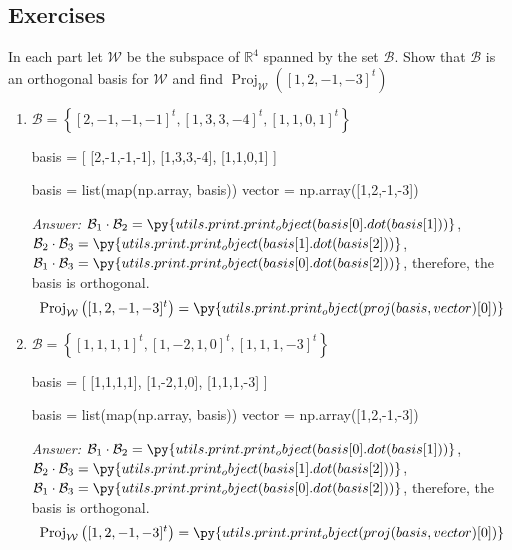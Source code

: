 \documentclass[letterpaper]{article}
\newcommand{\ans}{\textit{Answer: }}
\newenvironment{question}[2][Question]{\begin{trivlist}
\item[\hskip \labelsep {\bfseries #1}\hskip \labelsep {\bfseries #2.}]}{\end{trivlist}}
\newcommand{\printobj}[1]{\py{utils.print.print_object(#1)}}
\begin{document}
\subsection{Exercises}

\begin{question}{6.19}
  In each part let $\mathcal{W}$ be the subspace of $\mathbb{R}^{4}$ spanned by the set $\mathcal{B} .$ Show that $\mathcal{B}$ is
  an orthogonal basis for $\mathcal{W}$ and find $\operatorname{Proj}_{\mathcal{W}}\left([1,2,-1,-3]^{t}\right)$
  
  \begin{enumerate}[label=(\alph*)]
    \item $\mathcal{B}=\left\{[2,-1,-1,-1]^{t},[1,3,3,-4]^{t},[1,1,0,1]^{t}\right\}$
    
    \begin{pycode}
basis = [
  [2,-1,-1,-1],
  [1,3,3,-4],
  [1,1,0,1]
]

basis = list(map(np.array, basis))
vector = np.array([1,2,-1,-3])    
    \end{pycode}

    \ans $\mathcal{B}_1 \cdot \mathcal{B}_2 = \printobj{basis[0].dot(basis[1])}$,
    $\mathcal{B}_2 \cdot \mathcal{B}_3 = \printobj{basis[1].dot(basis[2])}$,
    $\mathcal{B}_1 \cdot \mathcal{B}_3 = \printobj{basis[0].dot(basis[2])}$,
    therefore, the basis is orthogonal.
    $$\operatorname{Proj}_{\mathcal{W}}\left([1,2,-1,-3]^{t}\right)
    = \printobj{proj(basis, vector)[0]}$$

    \item $\mathcal{B}=\left\{[1,1,1,1]^{t},[1,-2,1,0]^{t},[1,1,1,-3]^{t}\right\}$
    
    \begin{pycode}
basis = [
  [1,1,1,1],
  [1,-2,1,0],
  [1,1,1,-3]
]

basis = list(map(np.array, basis))
vector = np.array([1,2,-1,-3])
    \end{pycode}

    \ans $\mathcal{B}_1 \cdot \mathcal{B}_2 = \printobj{basis[0].dot(basis[1])}$,
    $\mathcal{B}_2 \cdot \mathcal{B}_3 = \printobj{basis[1].dot(basis[2])}$,
    $\mathcal{B}_1 \cdot \mathcal{B}_3 = \printobj{basis[0].dot(basis[2])}$,
    therefore, the basis is orthogonal.
    $$\operatorname{Proj}_{\mathcal{W}}\left([1,2,-1,-3]^{t}\right)
    = \printobj{proj(basis, vector)[0]}$$
  \end{enumerate}
\end{question}
\end{document}
